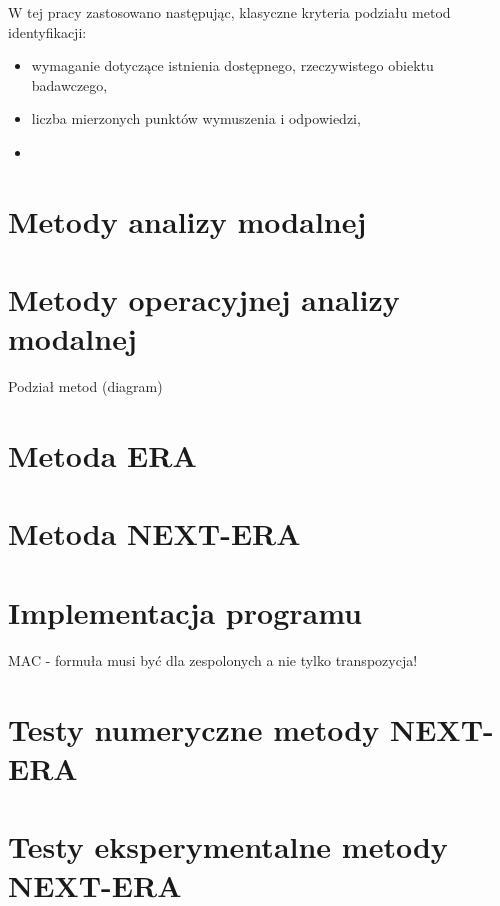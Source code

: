 W tej pracy zastosowano następując, klasyczne kryteria podziału metod identyfikacji:

\begin{itemize}
	\item wymaganie dotyczące istnienia dostępnego, rzeczywistego obiektu badawczego,
	\item liczba mierzonych punktów wymuszenia i odpowiedzi,
	\item 
\end{itemize}

	\section{Metody analizy modalnej}
	\section{Metody operacyjnej analizy modalnej}
	Podział metod (diagram)
	\section{Metoda ERA}
	\section{Metoda NEXT-ERA}
	\section{Implementacja programu}
MAC - \parencite{allemang_modal_2003} formuła musi być dla zespolonych a nie tylko transpozycja!
\section{Testy numeryczne metody NEXT-ERA}
\section{Testy eksperymentalne metody NEXT-ERA}

